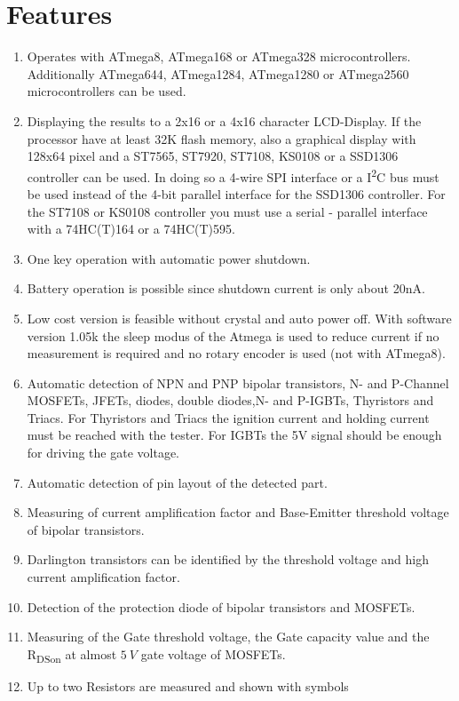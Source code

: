 \chapter{Features}
\label{sec:features}
\begin{enumerate}
\item Operates with ATmega8, ATmega168 or ATmega328 microcontrollers. Additionally ATmega644, ATmega1284,
ATmega1280 or ATmega2560 microcontrollers can be used.
\item Displaying the results to a 2x16 or a 4x16 character LCD-Display.
 If the processor have at least 32K flash memory, also a graphical display with 128x64 pixel and
a ST7565, ST7920, ST7108, KS0108 or a SSD1306 controller can be used.
In doing so a 4-wire SPI interface or a I\textsuperscript{2}C bus must be used instead of the 4-bit parallel interface for
the SSD1306 controller. For the ST7108 or KS0108 controller you must use a serial - parallel interface with a 74HC(T)164
or a 74HC(T)595.
\item One key operation with automatic power shutdown.
\item Battery operation is possible since shutdown current is only about 20nA.
\item Low cost version is feasible without crystal and auto power off.
With software version 1.05k the sleep modus of the Atmega is used to reduce current if
no measurement is required and no rotary encoder is used (not with ATmega8).
\item Automatic detection of NPN and PNP bipolar transistors, N- and P-Channel MOSFETs, JFETs,
diodes, double diodes,N- and P-IGBTs, Thyristors and Triacs.
For Thyristors and Triacs the ignition current and holding current must be reached with the tester.
For IGBTs the 5V signal should be enough for driving the gate voltage.
\item Automatic detection of pin layout of the detected part.
\item Measuring of current amplification factor and Base-Emitter threshold voltage of bipolar transistors.
\item Darlington transistors can be identified by the threshold voltage and high current amplification factor.
\item Detection of the protection diode of bipolar transistors and MOSFETs.
\item Measuring of the Gate threshold voltage, the Gate capacity value and the R\textsubscript{DSon} at almost \(5~V\) gate voltage of MOSFETs.
\item Up to two Resistors are measured and shown with symbols

\end{enumerate}
